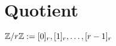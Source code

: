 \documentclass[10pt,a4paper]{article}
\begin{document}
\section{Quotient}
$\mathbb{Z}/r\mathbb{Z} := {[0]_r , [1]_r , \dots , [r-1]_r}$
\end{document}
